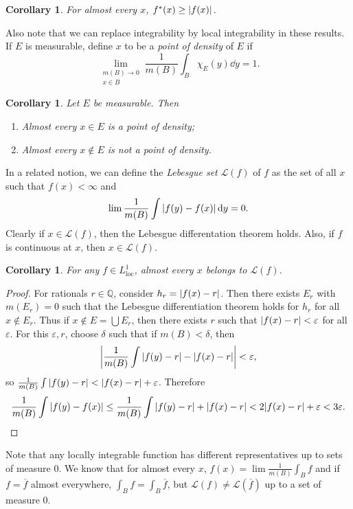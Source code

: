 \documentclass[leqno, openany]{memoir}
\newtheorem{cor}[thm]{Corollary}
\theoremstyle{definition}
\theoremstyle{remark}
\theoremstyle{plain}
\theoremstyle{definition}
\theoremstyle{remark}
\newcommand{\Q}{\mathbb{Q}}
\newcommand{\ep}{\varepsilon}
\newcommand{\mc}[1]{\mathcal{#1}}
\newcommand{\mr}[1]{\mathrm{#1}}
\newcommand{\ol}[1]{\overline{#1}}
\begin{document}
\begin{cor} For almost every $x$, $f^*(x) \geq \abs{f(x)}$.  \end{cor}

Also note that we can replace integrability by local integrability in these
results. If $E$ is measurable, define $x$ to be a \textit{point of density} of
$E$ if \[ \lim_{\substack{m(B) \to 0 \\ x \in B}} \frac{1}{m(B)} \int_B
\chi_E(y) \dd{y} = 1. \]

\begin{cor} Let $E$ be measurable. Then \begin{enumerate} \item Almost every $x
\in E$ is a point of density; \item Almost every $x \notin E$ is not a point of
density.  \end{enumerate} \end{cor}

In a related notion, we can define the \textit{Lebesgue set} $\mc{L}(f)$ of $f$
as the set of all $x$ such that $f(x) < \infty$ and \[ \lim \frac{1}{m(B)} \int
\abs{f(y) - f(x)} \dd{y} = 0. \] Clearly if $x \in \mc{L}(f)$, then the
Lebesgue differentation theorem holds. Also, if $f$ is continuous at $x$, then
$x \in \mc{L}(f)$.

\begin{cor} For any $f \in L^1_{\mr{loc}}$, almost every $x$ belongs to
$\mc{L}(f)$.  \end{cor}

\begin{proof} For rationals $r \in \Q$, consider $h_r = \abs{f(x) - r}$. Then
    there exists $E_r$ with $m(E_r) = 0$ such that the Lebesgue differentiation
    theorem holds for $h_r$ for all $x \notin E_r$. Thus if $x \notin E =
    \bigcup E_r$, then there exists $r$ such that $\abs{f(x) - r} < \ep$ for
    all $\ep$. For this $\ep, r$, choose $\delta$ such that if $m(B) < \delta$,
    then \[ \abs{\frac{1}{m(B)} \int \abs{f(y) - r} - \abs{f(x) - r}} < \ep, \]
    so $\frac{1}{m(B)} \int \abs{f(y) - r} < \abs{f(x) - r} + \ep$. Therefore
    \[ \frac{1}{m(B)} \int \abs{f(y) - f(x)} \leq \frac{1}{m(B)} \int \abs{f(y)
    - r} + \abs{f(x) - r} < 2 \abs{f(x) - r} + \ep < 3 \ep. \qedhere \]
\end{proof}

Note that any locally integrable function has different representatives up to
sets of measure $0$. We know that for almost every $x$, $f(x) = \lim
\frac{1}{m(B)} \int_B f$ and if $f = \ol{f}$ almost everywhere, $\int_B f =
\int_B \ol{f}$, but $\mc{L}(f) \neq \mc{L}(\ol{f})$ up to a set of measure $0$.
\end{document}
